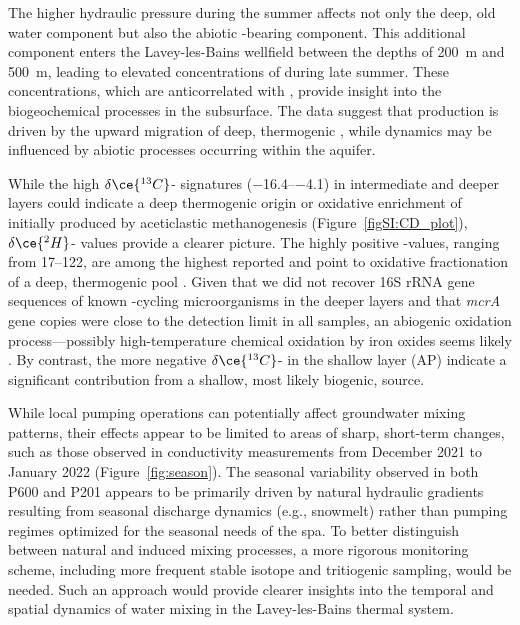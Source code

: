 The higher hydraulic pressure during the summer affects not only the deep, old water component but also the abiotic -bearing component.
This additional component enters the Lavey-les-Bains wellfield between the depths of \SI{200}{\metre} and \SI{500}{\metre}, leading to elevated concentrations of  during late summer. 
These  concentrations, which are anticorrelated with , provide insight into the biogeochemical processes in the subsurface.
The data suggest that  production is driven by the upward migration of deep, thermogenic , while  dynamics may be influenced by abiotic processes occurring within the aquifer.

While the high $\delta\ce{^{13}C}$- signatures (\SIrange{-16.4}{-4.1}{\permille}) in intermediate and deeper layers could indicate a deep thermogenic origin or oxidative enrichment of  initially produced by aceticlastic methanogenesis (Figure~\ref{figSI:CD_plot}), $\delta\ce{^{2}H}$- values provide a clearer picture.
The highly positive -values, ranging from \SIrange{17}{122}{\permille}, are among the highest reported and point to oxidative fractionation of a deep, thermogenic  pool \citep{etiope2011homorod}.
Given that we did not recover 16S rRNA gene sequences of known -cycling microorganisms in the deeper layers and that \textit{mcrA} gene copies were close to the detection limit in all samples, an abiogenic oxidation process—possibly high-temperature chemical oxidation by iron oxides seems likely \citep{etiope2011homorod}.
By contrast, the more negative $\delta\ce{^{13}C}$- in the shallow layer (AP) indicate a significant contribution from a shallow, most likely biogenic,  source.

While local pumping operations can potentially affect groundwater mixing patterns, their effects appear to be limited to areas of sharp, short-term changes, such as those observed in conductivity measurements from December 2021 to January 2022 (Figure~\ref{fig:season}).
The seasonal variability observed in both P600 and P201 appears to be primarily driven by natural hydraulic gradients resulting from seasonal discharge dynamics (e.g., snowmelt) rather than pumping regimes optimized for the seasonal needs of the spa.
To better distinguish between natural and induced mixing processes, a more rigorous monitoring scheme, including more frequent stable isotope and tritiogenic sampling, would be needed.
Such an approach would provide clearer insights into the temporal and spatial dynamics of water mixing in the Lavey-les-Bains thermal system.


